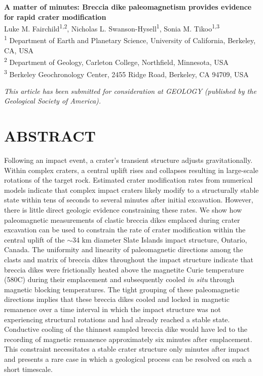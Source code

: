 \documentclass[11pt,letterpaper]{article}
\begin{document}
\begin{flushleft}
{\Large \textbf{A matter of minutes: Breccia dike paleomagnetism provides evidence for rapid crater modification}}
\\
Luke M. Fairchild\textsuperscript{1,2},
Nicholas L. Swanson-Hysell\textsuperscript{1},
Sonia M. Tikoo\textsuperscript{1,3}
\\
\bigskip
\textsuperscript{1} Department of Earth and Planetary Science, University of California, Berkeley, CA, USA
\\
\textsuperscript{2} Department of Geology, Carleton College, Northfield, Minnesota, USA
\\
\textsuperscript{3} Berkeley Geochronology Center, 2455 Ridge Road, Berkeley, CA 94709, USA
\bigskip

\end{flushleft}

\noindent\textit{This article has been submitted for consideration at GEOLOGY (published by the Geological Society of America).}

\linenumbers

\section*{ABSTRACT}
Following an impact event, a crater's transient structure adjusts gravitationally. Within complex craters, a central uplift rises and collapses resulting in large-scale rotations of the target rock. Estimated crater modification rates from numerical models indicate that complex impact craters likely modify to a structurally stable state within tens of seconds to several minutes after initial excavation. However, there is little direct geologic evidence constraining these rates. We show how paleomagnetic measurements of clastic breccia dikes emplaced during crater excavation can be used to constrain the rate of crater modification within the central uplift of the $\sim$34 km diameter Slate Islands impact structure, Ontario, Canada. The uniformity and linearity of paleomagnetic directions among the clasts and matrix of breccia dikes throughout the impact structure indicate that breccia dikes were frictionally heated above the magnetite Curie temperature (580\textdegree C) during their emplacement and subsequently cooled \textit{in situ} through magnetic blocking temperatures. The tight grouping of these paleomagnetic directions implies that these breccia dikes cooled and locked in magnetic remanence over a time interval in which the impact structure was not experiencing structural rotations and had already reached a stable state. Conductive cooling of the thinnest sampled breccia dike would have led to the recording of magnetic remanence approximately six minutes after emplacement. This constraint necessitates a stable crater structure only minutes after impact and presents a rare case in which a geological process can be resolved on such a short timescale.
\end{document}
